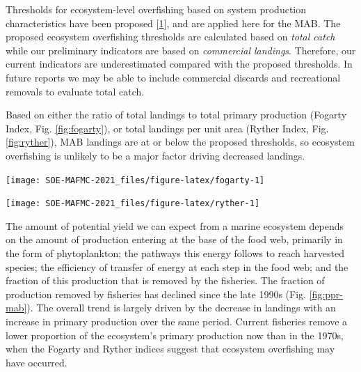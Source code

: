 \documentclass[
  10pt,
]{article}
\let\origfigure\figure
\let\endorigfigure\endfigure
\renewenvironment{figure}[1][2] {
    \expandafter\origfigure\expandafter[H]
} {
    \endorigfigure
}
\begin{document}
Thresholds for ecosystem-level overfishing based on system production
characteristics have been proposed
{[}\protect\hyperlink{ref-link_global_2019}{1}{]}, and are applied here
for the MAB. The proposed ecosystem overfishing thresholds are
calculated based on \emph{total catch} while our preliminary indicators
are based on \emph{commercial landings}. Therefore, our current
indicators are underestimated compared with the proposed thresholds. In
future reports we may be able to include commercial discards and
recreational removals to evaluate total catch.

Based on either the ratio of total landings to total primary production
(Fogarty Index, Fig. \ref{fig:fogarty}), or total landings per unit area
(Ryther Index, Fig. \ref{fig:ryther}), MAB landings are at or below the
proposed thresholds, so ecosystem overfishing is unlikely to be a major
factor driving decreased landings.\\

\begin{figure}

{\centering \texttt{[image: SOE-MAFMC-2021\_files/figure-latex/fogarty-1]} 

}

\caption{Fogarty Index; the ratio of total landings to total primary production in the MAB. Link and Watson (2019) give an optimal range (green shading) of the Fogarty ratio of 0.22 to 0.92 parts per thousand (PPT). Previous work suggested that index values exceeding 1 to 2 PPT (orange shading) led to ecosystem tipping points.}\label{fig:fogarty}
\end{figure}

\begin{figure}

{\centering \texttt{[image: SOE-MAFMC-2021\_files/figure-latex/ryther-1]} 

}

\caption{Ryther index; total landings presented on a unit area basis for the MAB. Theoretical estimates (Link and Watson, 2019) imply the index should range from 0.3 - 1.1 mt per sq km annually (green shading) with a limit of 3 mt per sq km annually, above which tipping points could occur in fished ecosystems (orange shading). Expected system-wide MSYs can be in the range of 1 to 3 mt per sq km (unshaded).}\label{fig:ryther}
\end{figure}

The amount of potential yield we can expect from a marine ecosystem
depends on the amount of production entering at the base of the food
web, primarily in the form of phytoplankton; the pathways this energy
follows to reach harvested species; the efficiency of transfer of energy
at each step in the food web; and the fraction of this production that
is removed by the fisheries. The fraction of production removed by
fisheries has declined since the late 1990s (Fig. \ref{fig:ppr-mab}).
The overall trend is largely driven by the decrease in landings with an
increase in primary production over the same period. Current fisheries
remove a lower proportion of the ecosystem's primary production now than
in the 1970s, when the Fogarty and Ryther indices suggest that ecosystem
overfishing may have occurred.
\end{document}
